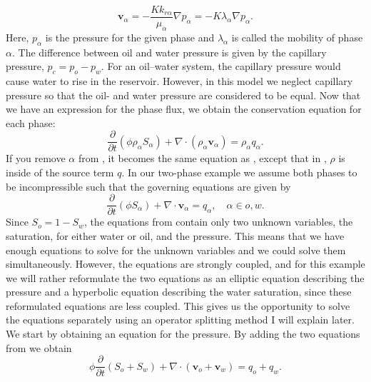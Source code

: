 \begin{equation*}
\textbf{v}_\alpha = - \frac{Kk_{r\alpha}}{\mu_\alpha}\nabla p_\alpha = -K\lambda_\alpha\nabla p_\alpha.
\end{equation*}
Here, $p_\alpha$ is the pressure for the given phase and $\lambda_\alpha$ is called the mobility of phase $\alpha$. The difference between oil and water pressure is given by the capillary pressure, $p_c = p_o - p_w$. For an oil--water system, the capillary pressure would cause water to rise in the reservoir. However, in this model we neglect capillary pressure so that the oil- and water pressure are considered to be equal. Now that we have an expression for the phase flux, we obtain the conservation equation for each phase:
\begin{equation}
    \frac{\partial}{\partial t}(\phi \rho_\alpha S_\alpha) + \nabla\cdot(\rho_\alpha\textbf{v}_\alpha) = \rho_\alpha q_\alpha.
    \label{eq:continuityEqMultiPhase}
\end{equation}
If you remove $\alpha$ from , it becomes the same equation as , except that in , $\rho$ is inside of the source term $q$. In our two-phase example we assume both phases to be incompressible such that the governing equations are given by
\begin{equation}
    \frac{\partial}{\partial t}(\phi S_\alpha) + \nabla\cdot\textbf{v}_\alpha =  q_\alpha, \hspace{1em} \alpha \in o, w.
    \label{eq:continuityEqsMultiPhaseIncomp}
\end{equation}
Since $S_o = 1 - S_w$, the equations from  contain only two unknown variables, the saturation, for either water or oil, and the pressure. This means that we have enough equations to solve for the unknown variables and we could solve them simultaneously. However, the equations are strongly coupled, and for this example we will rather reformulate the two equations as an elliptic equation describing the pressure and a hyperbolic equation describing the water saturation, since these reformulated equations are less coupled. This gives us the opportunity to solve the equations separately using an operator splitting method I will explain later. We start by obtaining an equation for the pressure. By adding the two equations from  we obtain
\begin{equation*}
    \phi \frac{\partial}{\partial t}(S_o + S_w) + \nabla\cdot(\textbf{v}_o + \textbf{v}_w) = q_o + q_w.
\end{equation*}

